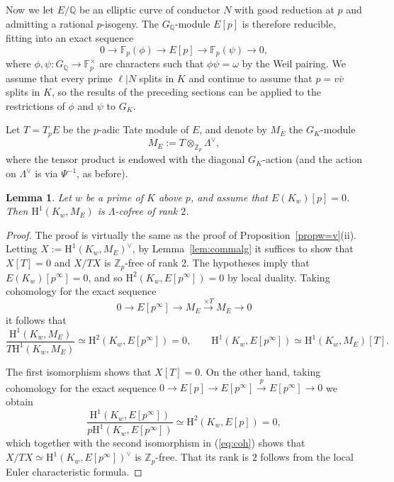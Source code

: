 \documentclass[10pt]{amsart}
\numberwithin{equation}{section}
\newtheorem{lemma}[theorem]{Lemma}
\theoremstyle{definition}
\theoremstyle{remark}
\newcommand{\bZ}{\mathbb{Z}}
\newcommand{\bQ}{\mathbb{Q}}
\newcommand{\rH}{\mathrm{H}}
\begin{document}
Now we let $E/\mathbb{Q}$ be an elliptic curve of conductor $N$ with good reduction at $p$ and admitting a rational $p$-isogeny. %
The $G_\bQ$-module $E[p]$ is therefore reducible, fitting into an exact sequence 
\begin{equation}\label{eq:es-mod}
0\rightarrow\mathbb{F}_p(\phi)\rightarrow E[p]\rightarrow\mathbb{F}_p(\psi)\rightarrow 0,
\end{equation}
where $\phi,\psi:G_\bQ\rightarrow\mathbb{F}_p^\times$ are characters such that $\phi\psi=\omega$ by the Weil pairing. We assume that every prime $\ell\vert N$ splits in $K$ and continue to assume that $p=v\bar{v}$ splits in $K$, so the results of the preceding sections can be applied to the restrictions of $\phi$ and $\psi$ to $G_K$.

Let $T=T_pE$ be the $p$-adic Tate module of $E$, and denote by $M_E$ the $G_K$-module
\[
M_E:=T\otimes_{\bZ_p}\Lambda^\vee,
\]
where the tensor product is endowed with the diagonal $G_K$-action (and the action on $\Lambda^\vee$ is via $\Psi^{-1}$, as before). 


\begin{lemma}\label{lemma411}
Let $w$ be a prime of $K$ above $p$, and assume that $E(K_w)[p]=0$. Then $\rH^1(K_w,M_E)$ is $\Lambda$-cofree of rank $2$.
\end{lemma}

\begin{proof} 
The proof is virtually the same as the proof of Proposition~\ref{propw=v}(ii). Letting $X:=\rH^1(K_w,M_E)^\vee$, by Lemma~\ref{lem:commalg} it suffices to show that $X[T]=0$ and $X/TX$ is $\bZ_p$-free of rank $2$. The hypotheses imply that $E(K_w)[p^\infty]=0$, and so $\rH^2(K_w,E[p^\infty])=0$ by local duality. Taking cohomology for the exact sequence 
\[
0\rightarrow E[p^\infty]\rightarrow M_E\xrightarrow{\times T}M_E\rightarrow 0
\] 
it follows that
\begin{equation}\label{eq:coh}
\frac{\rH^1(K_w,M_E)}{T\rH^1(K_w,M_E)}\simeq\rH^2(K_w,E[p^\infty])=0,\quad
\quad\rH^1(K_w,E[p^\infty])\simeq\rH^1(K_w,M_E)[T].
\end{equation}

The first isomorphism shows that $X[T]=0$. On the other hand, taking cohomology for the exact sequence $0\rightarrow E[p]\rightarrow E[p^\infty]\xrightarrow{p}E[p^\infty]\rightarrow 0$ we obtain
\[
\frac{\rH^1(K_w,E[p^\infty])}{p\rH^1(K_w,E[p^\infty])}\simeq\rH^2(K_w,E[p])=0,
\]
which together with the second isomorphism in (\ref{eq:coh}) shows that $X/TX\simeq\rH^1(K_w,E[p^\infty])^\vee$ is $\bZ_p$-free. That its rank is $2$ follows from the local Euler characteristic formula.
\end{proof}
\end{document}
